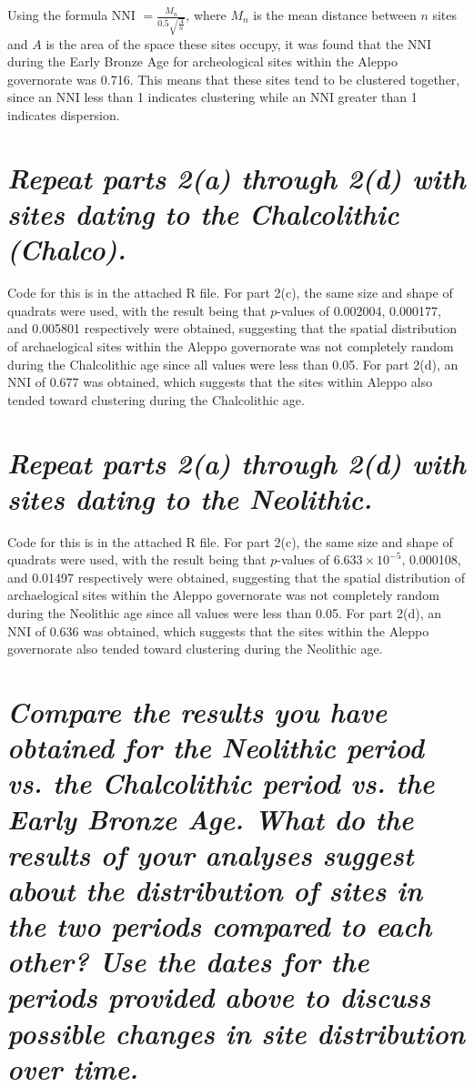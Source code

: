 \documentclass[answers]{exam}
\begin{document}
\begin{parts}
\quad\quad\color{nr}Using the formula NNI $ = \frac{M_n}{0.5\sqrt{\frac{A}{n}}}$, where $M_n$ is the mean distance between $n$ sites and $A$ is the area of the space these sites occupy, it was found that the NNI during the Early Bronze Age for archeological sites within the Aleppo governorate was 0.716. This means that these sites tend to be clustered together, since an NNI less than 1 indicates clustering while an NNI greater than 1 indicates dispersion.

\color{black}\part{\textit{Repeat parts 2(a) through 2(d) with sites dating to the Chalcolithic (Chalco).}}

\quad\quad\color{nr}Code for this is in the attached R file. For part 2(c), the same size and shape of quadrats were used, with the result being that $p$-values of 0.002004, 0.000177, and 0.005801 respectively were obtained, suggesting that the spatial distribution of archaelogical sites within the Aleppo governorate was not completely random during the Chalcolithic age since all values were less than 0.05. For part 2(d), an NNI of 0.677 was obtained, which suggests that the sites within Aleppo also tended toward clustering during the Chalcolithic age.

\color{black}\part{\textit{Repeat parts 2(a) through 2(d) with sites dating to the Neolithic.}}

\quad\quad\color{nr}Code for this is in the attached R file. For part 2(c), the same size and shape of quadrats were used, with the result being that $p$-values of $6.633\times10^{-5}$, 0.000108, and 0.01497 respectively were obtained, suggesting that the spatial distribution of archaelogical sites within the Aleppo governorate was not completely random during the Neolithic age since all values were less than 0.05. For part 2(d), an NNI of 0.636 was obtained, which suggests that the sites within the Aleppo governorate also tended toward clustering during the Neolithic age.

\color{black}\part{\textit{Compare the results you have obtained for the Neolithic period vs. the Chalcolithic period vs. the Early Bronze Age. What do the results of your analyses suggest about the distribution of sites in the two periods compared to each other? Use the dates for the periods provided above to discuss possible changes in site distribution over time.}}


\end{parts}
\end{document}
